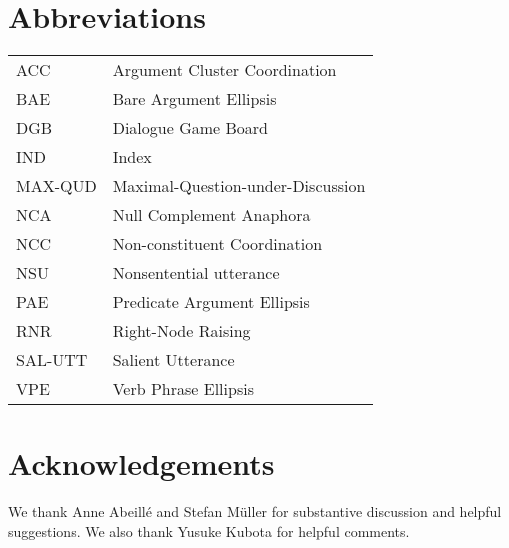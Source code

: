 \section*{Abbreviations}

\begin{tabularx}{.99\textwidth}{@{}lX}
ACC & Argument Cluster Coordination\\
BAE & Bare Argument Ellipsis\\
DGB & Dialogue Game Board\\
IND & Index\\
MAX-QUD & Maximal-Question-under-Discussion\\
NCA & Null Complement Anaphora\\
NCC & Non-constituent Coordination\\ 
NSU & Nonsentential utterance\\
PAE & Predicate Argument Ellipsis\\
RNR & Right-Node Raising\\
SAL-UTT & Salient Utterance\\
VPE & Verb Phrase Ellipsis\\
\end{tabularx}


\section*{Acknowledgements}
We thank Anne Abeill\'{e} and Stefan M\"{u}ller
for substantive discussion and helpful suggestions. We also thank  
Yusuke Kubota for helpful comments.  

{\sloppy
\printbibliography[heading=subbibliography,notkeyword=this]
}
%





